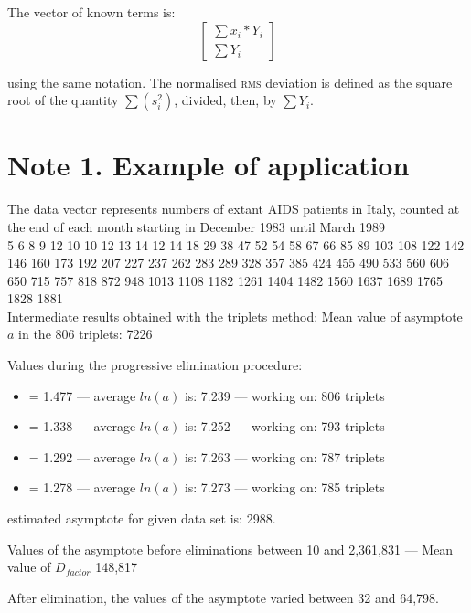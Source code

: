 \documentclass[%
 aip,
 jmp,%
 amsmath,amssymb,
 reprint,%
]{revtex4-1}
\begin{document}
The vector of known terms is:
\[
\begin{bmatrix}
	\sum x_i * Y_i \\ 
	\sum Y_i
\end{bmatrix}
\]

using the same notation.
The normalised \textsc{rms} deviation is defined as the square root of the quantity $\sum(s_i^2)$, divided, then, by $\sum Y_i$.

\section{\label{sec:level1}Note 1. Example of application}
The data vector  represents numbers  of extant AIDS  patients in  Italy, counted at the end of each month  starting in December 1983 until  March 1989\\

5    6    8    9   12   10   10   12   13   14   12   14    18   29   38   47   52   54   58   67   66   85   89  103   108  122  142  146  160  173  192  207  227  237  262  283 289  328  357  385  424  455  490  533  560  606  650  715 757  818  872  948 1013 1108 1182 1261 1404 1482 1560 1637 1689 1765 1828 1881\\

Intermediate results obtained with the triplets method:
Mean value of asymptote $a$ in the 806 triplets: 7226

Values during the progressive elimination procedure:

\begin{itemize}  
\item = 1.477 --- average $ln(a)$ is: 7.239 --- working on:  806 triplets
\item = 1.338 --- average $ln(a)$ is: 7.252 --- working on:  793 triplets
\item = 1.292 --- average $ln(a)$ is: 7.263 --- working on:  787 triplets
\item = 1.278 --- average $ln(a)$ is: 7.273 --- working on:  785 triplets

\end{itemize}
estimated asymptote for given data set is:  2988.

Values of the asymptote before eliminations between 10 and 2,361,831 --- Mean value of $D_{factor}$ 148,817

After elimination, the values of the asymptote varied between 32 and 64,798.
\end{document}
